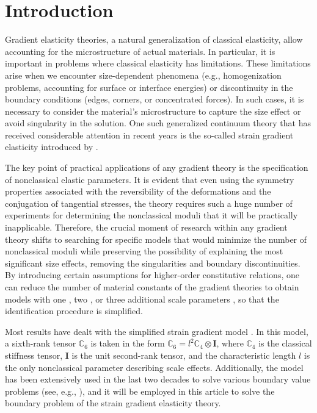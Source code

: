 \section{Introduction}

Gradient elasticity theories, a natural generalization of classical elasticity, allow accounting for the microstructure of actual materials. In particular, it is important in problems where classical elasticity has limitations. These limitations arise when we encounter size-dependent phenomena (e.g., homogenization problems, accounting for surface or interface energies) or discontinuity in the boundary conditions (edges, corners, or concentrated forces). In such cases, it is necessary to consider the material's microstructure to capture the size effect or avoid singularity in the solution. One such generalized continuum theory that has received considerable attention in recent years is the so-called strain gradient elasticity introduced by \cite{Chirkov1, Chirkov2, Chirkov3}.

The key point of practical applications of any gradient theory is the specification of nonclassical elastic parameters. It is evident that even using the symmetry properties associated with the reversibility of the deformations and the conjugation of tangential stresses, the theory requires such a huge number of experiments for determining the nonclassical moduli that it will be practically inapplicable. Therefore, the crucial moment of research within any gradient theory shifts to searching for specific models that would minimize the number of nonclassical moduli while preserving the possibility of explaining the most significant size effects, removing the singularities and boundary discontinuities. By introducing certain assumptions for higher-order constitutive relations, one can reduce the number of material constants of the gradient theories to obtain models with one \cite{Chirkov4, Chirkov5, Chirkov6, Chirkov7, Chirkov8, Chirkov9, Chirkov10, Chirkov11}, two \cite{Chirkov3, Chirkov6, Chirkov12}, or three additional scale parameters \cite{Chirkov6, Chirkov12}, so that the identification procedure is simplified.

Most results have dealt with the simplified strain gradient model \cite{Chirkov4, Chirkov13}. In this model, a sixth-rank tensor ${{\mathbb C}}_6$ is taken in the form ${{{\mathbb C}}_6=l}^2{{\mathbb C}}_4\otimes {\mathbf I}$, where ${{\mathbb C}}_4$ is the classical stiffness tensor, ${\mathbf I}$ is the unit second-rank tensor, and the characteristic length $l$ is the only nonclassical parameter describing scale effects. Additionally, the model has been extensively used in the last two decades to solve various boundary value problems (see, e.g., \cite{Chirkov14, Chirkov15, Chirkov16, Chirkov17, Chirkov18, Chirkov19, Chirkov20, Chirkov21, Chirkov22, Chirkov23, Chirkov24, Chirkov25}), and it will be employed in this article to solve the boundary problem of the strain gradient elasticity theory.

